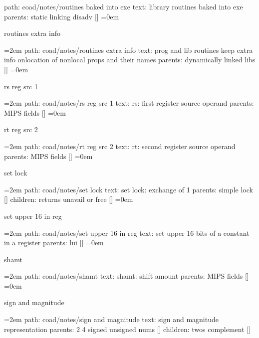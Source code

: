 path: coad/notes/routines baked into exe
\smallskip
text:  library routines baked into exe
\smallskip
parents:  static linking disadv []
\smallskip
\leftskip=0em
\par\endgroup
\bigskip
{}
routines extra info
\smallskip
\par\begingroup
\leftskip=2em
path: coad/notes/routines extra info
\smallskip
text:  prog and lib routines keep extra info onlocation of nonlocal props and their names
\smallskip
parents:  dynamically linked libs []
\smallskip
\leftskip=0em
\par\endgroup
\bigskip
{}
rs reg src 1
\smallskip
\par\begingroup
\leftskip=2em
path: coad/notes/rs reg src 1
\smallskip
text:  rs: first register source operand
\smallskip
parents:  MIPS fields []
\smallskip
\leftskip=0em
\par\endgroup
\bigskip
{}
rt reg src 2
\smallskip
\par\begingroup
\leftskip=2em
path: coad/notes/rt reg src 2
\smallskip
text:  rt: second register source operand
\smallskip
parents:  MIPS fields []
\smallskip
\leftskip=0em
\par\endgroup
\bigskip
{}
set lock
\smallskip
\par\begingroup
\leftskip=2em
path: coad/notes/set lock
\smallskip
text:  set lock: exchange of 1
\smallskip
parents:  simple lock []
\smallskip
children: returns unavail or free []
\smallskip
\leftskip=0em
\par\endgroup
\bigskip
{}
set upper 16 in reg
\smallskip
\par\begingroup
\leftskip=2em
path: coad/notes/set upper 16 in reg
\smallskip
text:  set upper 16 bits of a constant in a register
\smallskip
parents:  lui []
\smallskip
\leftskip=0em
\par\endgroup
\bigskip
{}
shamt
\smallskip
\par\begingroup
\leftskip=2em
path: coad/notes/shamt
\smallskip
text:  shamt: shift amount
\smallskip
parents:  MIPS fields []
\smallskip
\leftskip=0em
\par\endgroup
\bigskip
{}
sign and magnitude
\smallskip
\par\begingroup
\leftskip=2em
path: coad/notes/sign and magnitude
\smallskip
text:  sign and magnitude representation
\smallskip
parents:  2 4 signed unsigned nums []
\smallskip
children: twos complement []
\smallskip
